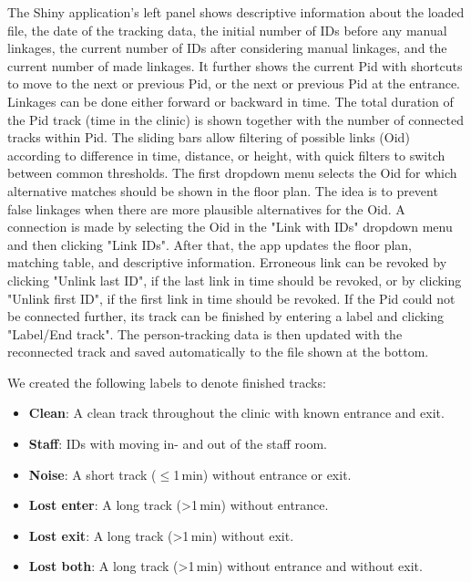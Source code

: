 \documentclass[fleqn,11pt]{wlscirep_supp}
\begin{document}
The Shiny application's left panel shows descriptive information about the loaded file, the date of the tracking data, the initial number of IDs before any manual linkages, the current number of IDs after considering manual linkages, and the current number of made linkages. It further shows the current Pid with shortcuts to move to the next or previous Pid, or the next or previous Pid at the entrance. Linkages can be done either forward or backward in time. The total duration of the Pid track (time in the clinic) is shown together with the number of connected tracks within Pid. The sliding bars allow filtering of possible links (Oid) according to difference in time, distance, or height, with quick filters to switch between common thresholds. The first dropdown menu selects the Oid for which alternative matches should be shown in the floor plan. The idea is to prevent false linkages when there are more plausible alternatives for the Oid. A connection is made by selecting the Oid in the "Link with IDs" dropdown menu and then clicking "Link IDs". After that, the app updates the floor plan, matching table, and descriptive information. Erroneous link can be revoked by clicking "Unlink last ID", if the last link in time should be revoked, or by clicking "Unlink first ID", if the first link in time should be revoked. If the Pid could not be connected further, its track can be finished by entering a label and clicking "Label/End track". The person-tracking data is then updated with the reconnected track and saved automatically to the file shown at the bottom.

We created the following labels to denote finished tracks: 
\begin{itemize}
    \item \textbf{Clean}: A clean track throughout the clinic with known entrance and exit.
    \item \textbf{Staff}: IDs with moving in- and out of the staff room.
    \item \textbf{Noise}: A short track ($\leq$1\,min) without entrance or exit.
    \item \textbf{Lost enter}: A long track (>1\,min) without entrance.
    \item \textbf{Lost exit}: A long track (>1\,min) without exit.
    \item \textbf{Lost both}: A long track (>1\,min) without entrance and without exit.
\end{itemize}
\end{document}
